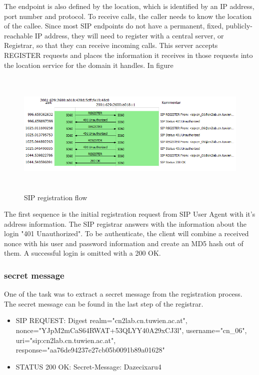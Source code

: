 \documentclass[parskip=full]{scrartcl}
\begin{document}
The endpoint is also defined by the location, which is identified by an IP address, port number and protocol. To receive calls, the caller needs to know the location of the callee. Since most SIP endpoints do not have a permanent, fixed, publicly-reachable IP address, they will need to register with a central server, or Registrar, so that they can receive incoming calls. This server accepts REGISTER requests and places the information it receives in those requests into the location service for the domain it handles. In figure 

\begin{figure}[!ht]
	\centering %
	\includegraphics[height=6cm]{images/sip_flowseq.png} %
	\caption{SIP registration flow} 
	\label{fig:SIP Registrar} %
\end{figure} 

The first sequence is the initial registration request from SIP User Agent with it's address information. The SIP registrar answers with the information about the login "401 Unauthorized". To be authenticate, the client will combine a received nonce with his user and password information and create an MD5 hash out of them. A successful login is omitted with a 200 OK.

\subsubsection{secret message}
One of the task was to extract a secret message from the registration process. The secret message can be found in the last step of the registrar.

\begin{itemize}
	\item SIP REQUEST: Digest realm="cn2lab.cn.tuwien.ac.at", nonce="YJpM2mCaS64RWAT+53QLYY40A29xCJ3l", username="cn\_06",  uri="sip:cn2lab.cn.tuwien.ac.at", response="aa76de94237e27cb05b0091b89a01628"
	\item STATUS 200 OK: Secret-Message: Dazecixaru4
\end{itemize}
\end{document}
